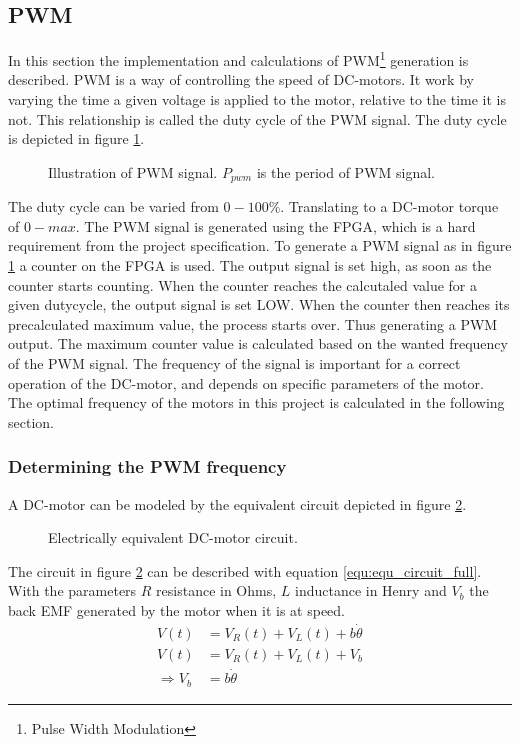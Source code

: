 \documentclass[../../../Main]{subfiles}
\begin{document}
\subsection{PWM}
In this section the implementation and calculations of PWM\footnote{Pulse Width Modulation} generation is described. PWM is a way of controlling the speed of DC-motors. It work by varying the time a given voltage is applied to the motor, relative to the time it is not. This relationship is called the duty cycle of the PWM signal. The duty cycle is depicted in figure \ref{fig:pwm}.

\begin{figure}[h]
  
  \caption{Illustration of PWM signal. $P_{pwm}$ is the period of PWM signal.}
  \label{fig:pwm}
\end{figure}

The duty cycle can be varied from $0 - 100\%$. Translating to a DC-motor torque of $0 - max$.
The PWM signal is generated using the FPGA, which is a hard requirement from the project  specification. To generate a PWM signal as in figure \ref{fig:pwm} a counter on the FPGA  is used.
The output signal is set high, as soon as the counter starts counting. When the counter reaches the calcutaled value for a given dutycycle, the output signal is set LOW. When the counter then reaches its precalculated maximum value, the process starts over. Thus generating a PWM output. The maximum counter value is calculated based on the wanted frequency of the PWM signal. The frequency of the signal is important for a correct operation of the DC-motor, and depends on specific parameters of the motor. The optimal frequency of the motors in this project is calculated in the following section.
\newpage
\subsubsection{Determining the PWM frequency}

A DC-motor can be modeled by the equivalent circuit depicted in figure \ref{fig:electrical_equ}.

\begin{figure}[ht]
	\center
	
	\caption{Electrically equivalent DC-motor circuit.}
  \label{fig:electrical_equ}
\end{figure}
The circuit in figure \ref{fig:electrical_equ} can be described with equation \ref{equ:equ_circuit_full}. With the parameters $R$ resistance in Ohms, $L$ inductance in Henry and $V_b$ the back EMF generated by the motor when it is at speed.
\begin{align}
	V(t) &= V_R(t) + V_L(t) + b\dot{\theta}\\
 \label{equ:equ_circuit_full}
	V(t) &= V_R(t) + V_L(t) + V_b\\
	\Rightarrow V_b &= b\dot{\theta}
\end{align}
\end{document}

